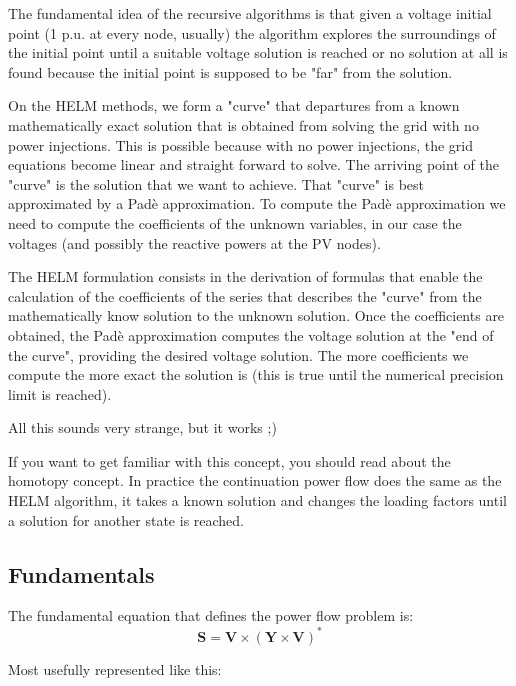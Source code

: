 \documentclass[a4paper,twoside,fleqn]{tufte-book}
\begin{document}
The fundamental idea of the recursive algorithms is that given a voltage initial point (1 p.u. at every node, usually) the algorithm explores the surroundings of the initial point until a suitable voltage solution is reached or no solution at all is found because the initial point is supposed to be "far" from the solution.

On the HELM methods, we form a "curve" that departures from a known mathematically exact solution that is obtained from solving the grid with no power injections. This is possible because with no power injections, the grid equations become linear and straight forward to solve. The arriving point of the "curve" is the solution that we want to achieve. That "curve" is best approximated by a Padè approximation. To compute the Padè approximation we need to compute the coefficients of the unknown variables, in our case the voltages (and possibly the reactive powers at the PV nodes).

The HELM formulation consists in the derivation of formulas that enable the calculation of the coefficients of the series that describes the "curve" from the mathematically know solution to the unknown solution. Once the coefficients are obtained, the Padè approximation computes the voltage solution at the "end of the curve", providing the desired voltage solution. The more coefficients we compute the more exact the solution is (this is true until the numerical precision limit is reached).\newline 


All this sounds very strange, but it works ;)\newline 


If you want to get familiar with this concept, you should read about the homotopy concept. In practice the continuation power flow does the same as the HELM algorithm, it takes a known solution and changes the loading factors until a solution for another state is reached.

\subsection{Fundamentals} \label{helm_fundamentals}

The fundamental equation that defines the power flow problem is:
\begin{equation}
\textbf{S} = \textbf{V} \times (\textbf{Y} \times \textbf{V})^*
\end{equation}

Most usefully represented like this:
\end{document}
